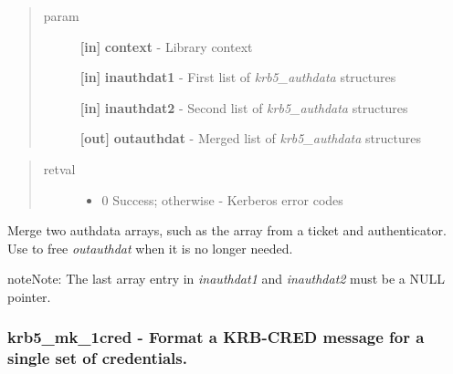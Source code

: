 \documentclass[letterpaper,10pt,english]{sphinxmanual}
\begin{document}
\begin{quote}\begin{description}
\item[{param}] \leavevmode
\textbf{{[}in{]}} \textbf{context} - Library context

\textbf{{[}in{]}} \textbf{inauthdat1} - First list of \emph{krb5\_authdata} structures

\textbf{{[}in{]}} \textbf{inauthdat2} - Second list of \emph{krb5\_authdata} structures

\textbf{{[}out{]}} \textbf{outauthdat} - Merged list of \emph{krb5\_authdata} structures

\end{description}\end{quote}
\begin{quote}\begin{description}
\item[{retval}] \leavevmode\begin{itemize}
\item {} 
0   Success; otherwise - Kerberos error codes

\end{itemize}

\end{description}\end{quote}

Merge two authdata arrays, such as the array from a ticket and authenticator. Use {\hyperref[appdev/refs/api/krb5_free_authdata:krb5_free_authdata]{}} to free \emph{outauthdat} when it is no longer needed.

\begin{notice}{note}{Note:}
The last array entry in \emph{inauthdat1} and \emph{inauthdat2} must be a NULL pointer.
\end{notice}


\subsubsection{krb5\_mk\_1cred -  Format a KRB-CRED message for a single set of credentials.}
\label{appdev/refs/api/krb5_mk_1cred:krb5-mk-1cred-format-a-krb-cred-message-for-a-single-set-of-credentials}\label{appdev/refs/api/krb5_mk_1cred::doc}

\begin{fulllineitems}
\label{appdev/refs/api/krb5_mk_1cred:krb5_mk_1cred}
\end{fulllineitems}
\end{document}
